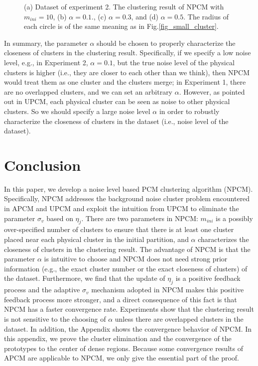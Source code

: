 \documentclass[journal]{IEEEtran}
\theoremstyle{definition}
\begin{document}
\begin{figure}[tb]
\caption{(a) Dataset of experiment 2. The clustering result of NPCM with $m_{ini}=10$, (b) $\alpha=0.1.$, (c) $\alpha=0.3$, and (d) $\alpha=0.5$.
The radius of each circle is of the same meaning as in Fig.\ref{fig_small_cluster}.}
\label{fig_close_cluster}
\end{figure}

In summary, the parameter $\alpha$ should be chosen to  properly characterize the closeness of clusters in the clustering result. Specifically, if we specify a low noise level, e.g., in Experiment 2, $\alpha=0.1$, but the true noise level of the physical clusters is higher (i.e., they are closer to each other than we think), then NPCM would treat them as one cluster and the clusters merge; in Experiment 1, there are no overlapped clusters, and we can set an arbitrary $\alpha$.
However, as pointed out in UPCM, each physical cluster can be seen as noise to other physical clusters. So we should specify a large noise level $\alpha$ in order to robustly characterize the closeness of clusters in the dataset (i.e., noise level of the dataset).
\section{Conclusion}
\label{sec-5}
In this paper, we develop a noise level based PCM clustering algorithm (NPCM). Specifically, NPCM addresses the background noise cluster problem encountered in APCM and UPCM and exploit the intuition from UPCM to eliminate the parameter $\sigma_v$ based on $\eta_j$.
There are two parameters in NPCM: $m_{ini}$ is a possibly over-specified number of clusters to ensure that there is at least one cluster placed near each physical cluster in the initial partition, and $\alpha$ characterizes the closeness of clusters in the clustering result.
The advantage of NPCM is that the parameter $\alpha$ is intuitive to choose and NPCM does not need strong prior information (e.g., the exact cluster number or the exact closeness of clusters) of the dataset.
Furthermore, we find that the update of $\eta_j$ is a positive feedback process and the adaptive $\sigma_v$ mechanism adopted in NPCM makes this positive feedback process more stronger, and a direct consequence of this fact is that NPCM has a faster convergence rate. 
Experiments show that the clustering result is not sensitive to the choosing of $\alpha$ unless there are overlapped clusters in the dataset.
In addition, the Appendix shows the convergence behavior of NPCM.
\appendix
In this appendix, we prove the cluster elimination and the convergence of the prototypes to the center of dense regions. Because some convergence results of APCM \cite{xenaki_novel_2016} are applicable to NPCM, we only give the essential part of the proof. 
\end{document}
